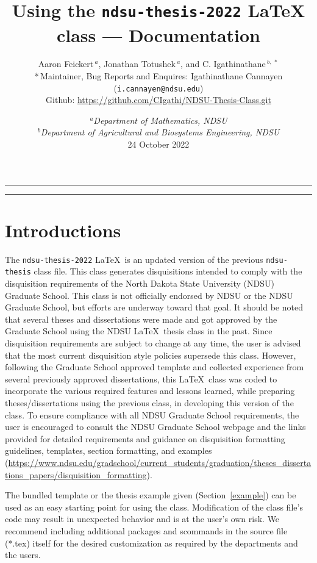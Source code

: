 \documentclass{article}
\title{\vspace{-1.5cm}Using the \texttt{ndsu-thesis-2022} \LaTeX\/ class --- Documentation}
\author{Aaron Feickert$\,^{a}$, Jonathan Totushek$\,^{a}$, and C. Igathinathane$\,^{b,\,*}$ \\ *\,Maintainer, Bug Reports and Enquires:  Igathinathane Cannayen (\texttt{i.cannayen@ndsu.edu})\\ {\small Github: \url{https://github.com/CIgathi/NDSU-Thesis-Class.git}}
}
\date{{\small $^{a}$\emph{Department of Mathematics, NDSU} \\ $^{b}$\emph{Department of Agricultural and Biosystems Engineering, NDSU}\\[2ex]}
24 October 2022}
\newcommand\ix[1]{#1\index{#1}} %
\begin{document}
\maketitle

\hrule
\begin{multicols}{2}
\scriptsize
\tableofcontents
\end{multicols}
\hrule

\section{Introductions}
The \texttt{ndsu-thesis-2022} \LaTeX\ is an updated version of the previous \texttt{ndsu-thesis} \ix{class} file. This class generates disquisitions intended to comply with the disquisition requirements of the North Dakota State University (NDSU) Graduate School. This class is not officially endorsed by NDSU or the NDSU Graduate School, but efforts are underway toward that goal. It should be noted that several theses and dissertations were made and got approved by the Graduate School using the NDSU \LaTeX\ thesis class in the past. Since disquisition requirements are subject to change at any time, the user is advised that the most current disquisition style policies supersede this class. However, following the Graduate School approved template and collected experience from several previously approved dissertations, this \LaTeX\ class was coded to incorporate the various required features and lessons learned, while preparing theses/dissertations using the previous class, in developing this version of the class. To ensure compliance with all NDSU Graduate School requirements, the user is encouraged to consult the NDSU Graduate School webpage and the links provided for detailed requirements and guidance on disquisition formatting guidelines, templates, section formatting, and examples (\url{https://www.ndsu.edu/gradschool/current_students/graduation/theses_dissertations_papers/disquisition_formatting}).

The bundled \ix{template} or the thesis example given (Section~\ref{example}) can be used as an easy starting point for using the class. Modification of the class file's code may result in unexpected behavior and is at the user's own risk. We recommend including additional packages and scommands in the source file (*.tex) itself for the desired customization as required by the departments and the users. 
\end{document}
